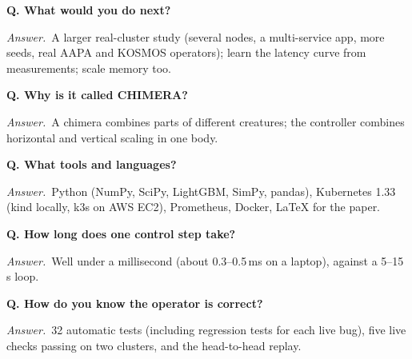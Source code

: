 \documentclass[11pt,a4paper]{article}
\newcommand{\Q}[1]{\par\medskip\textbf{Q. #1}\par}
\newcommand{\A}{\textit{Answer.}~}
\begin{document}
\Q{What would you do next?}
\A A larger real-cluster study (several nodes, a multi-service app, more seeds, real AAPA
and KOSMOS operators); learn the latency curve from measurements; scale memory too.

\Q{Why is it called CHIMERA?}
\A A chimera combines parts of different creatures; the controller combines horizontal and
vertical scaling in one body.

\Q{What tools and languages?}
\A Python (NumPy, SciPy, LightGBM, SimPy, pandas), Kubernetes 1.33 (kind locally, k3s on
AWS EC2), Prometheus, Docker, LaTeX for the paper.

\Q{How long does one control step take?}
\A Well under a millisecond (about 0.3--0.5\,ms on a laptop), against a 5--15\,s loop.

\Q{How do you know the operator is correct?}
\A 32 automatic tests (including regression tests for each live bug), five live checks
passing on two clusters, and the head-to-head replay.
\end{document}
